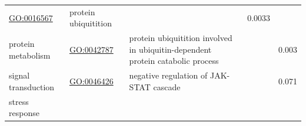 \documentclass[
]{article}
\begin{document}
\begin{longtable}[]{@{}lllll@{}}
\begin{minipage}[t]{0.17\columnwidth}
\url{GO:0016567}\strut
\end{minipage} & \begin{minipage}[t]{0.17\columnwidth}\raggedright
protein ubiquitition\strut
\end{minipage} & \begin{minipage}[t]{0.17\columnwidth}\raggedright
\strut
\end{minipage} & \begin{minipage}[t]{0.17\columnwidth}\raggedright
0.0033\strut
\end{minipage}\tabularnewline
\begin{minipage}[t]{0.17\columnwidth}\raggedright
protein metabolism\strut
\end{minipage} & \begin{minipage}[t]{0.17\columnwidth}\raggedright
\url{GO:0042787}\strut
\end{minipage} & \begin{minipage}[t]{0.17\columnwidth}\raggedright
protein ubiquitition involved in ubiquitin-dependent protein catabolic
process\strut
\end{minipage} & \begin{minipage}[t]{0.17\columnwidth}\raggedright
\strut
\end{minipage} & \begin{minipage}[t]{0.17\columnwidth}\raggedright
0.003\strut
\end{minipage}\tabularnewline
\begin{minipage}[t]{0.17\columnwidth}\raggedright
signal transduction\strut
\end{minipage} & \begin{minipage}[t]{0.17\columnwidth}\raggedright
\url{GO:0046426}\strut
\end{minipage} & \begin{minipage}[t]{0.17\columnwidth}\raggedright
negative regulation of JAK-STAT cascade\strut
\end{minipage} & \begin{minipage}[t]{0.17\columnwidth}\raggedright
\strut
\end{minipage} & \begin{minipage}[t]{0.17\columnwidth}\raggedright
0.071\strut
\end{minipage}\tabularnewline
\begin{minipage}[t]{0.17\columnwidth}\raggedright
stress response\strut
\end{minipage} & \begin{minipage}[t]{0.17\columnwidth}\raggedright

\end{minipage}
\end{longtable}
\end{document}
